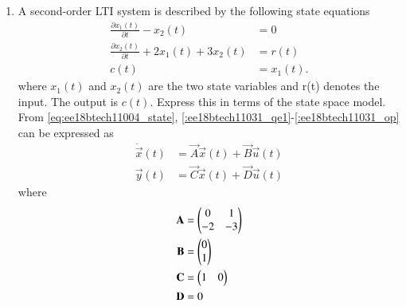 \begin{enumerate}[label=\thesubsection.\arabic*.,ref=\thesubsection.\theenumi]

\item A second-order LTI system is described by the following state equations
\begin{align}
\label{:ee18btech11031_qe1}
\frac{\partial x_1(t)}{\partial t} - x_2(t) &= 0
\\
\label{:ee18btech11031_qe2}
\frac{\partial x_2(t)}{\partial t} + 2x_1(t) + 3x_2(t) &= r(t)
\\
c(t) &= x_1(t).
\label{:ee18btech11031_op}
\end{align}
%
where $x_1(t)$ and $x_2(t)$ are the two state variables and r(t) denotes the input. The output is $c(t)$.  Express this in terms of the state space model.
%
\\
\solution From \eqref{eq:ee18btech11004_state}, \eqref{:ee18btech11031_qe1}-\eqref{:ee18btech11031_op} can be expressed as
%
\begin{align}
\dot{\vec{x}}(t)&=\vec{A}\vec{x}(t)+\vec{B}\vec{u}(t) \\
 \vec{y}(t)&=\vec{C}\vec{x}(t)+\vec{D} \vec{u}(t)
\end{align}
%
where
\begin{align}
    \mathbf{A} &= \begin{pmatrix}0&1\\-2&-3\end{pmatrix}
\\
    \mathbf{B} &= \begin{pmatrix}0\\1\end{pmatrix}
\\
    \mathbf{C} &= \begin{pmatrix}1&0\end{pmatrix}
\\
    \mathbf{D} &= 0
\end{align}


\end{enumerate}
